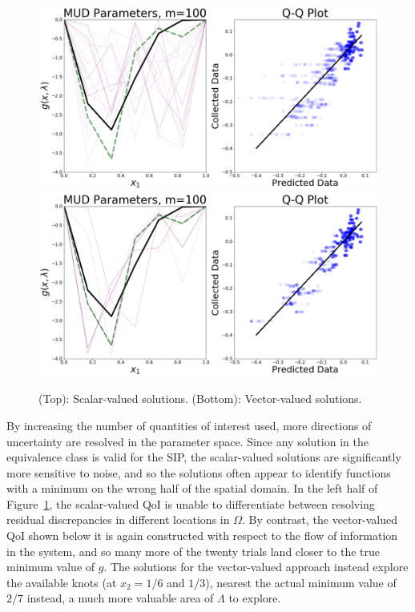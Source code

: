 \begin{figure}[htbp]
\centering
  \includegraphics[width=0.95\linewidth]{figures/pde-highd/pde-highd_pair_D5-1_m100}
  \includegraphics[width=0.95\linewidth]{figures/pde-highd/pde-highd_pair_D5-5_m100}
\caption{
(Top): Scalar-valued solutions.
(Bottom): Vector-valued solutions.
}
\label{fig:pde-highd-5d-mud}
\end{figure}

By increasing the number of quantities of interest used, more directions of uncertainty are resolved in the parameter space.
Since any solution in the equivalence class is valid for the SIP, the scalar-valued solutions are significantly more sensitive to noise, and so the solutions often appear to identify functions with a minimum on the wrong half of the spatial domain.
In the left half of Figure~\ref{fig:pde-highd-5d-mud}, the scalar-valued QoI is unable to differentiate between resolving residual discrepancies in different locations in $\Omega$.
By contrast, the vector-valued QoI shown below it is again constructed with respect to the flow of information in the system, and so many more of the twenty trials land closer to the true minimum value of $g$.
The solutions for the vector-valued approach instead explore the available knots (at $x_2=1/6$ and $1/3$), nearest the actual minimum value of $2/7$ instead, a much more valuable area of $\Lambda$ to explore.


